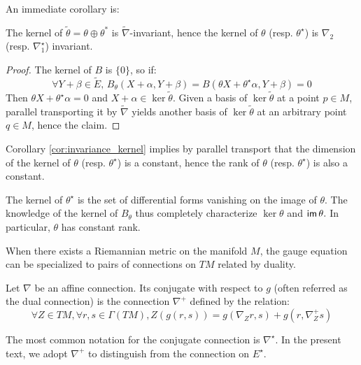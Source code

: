  An immediate corollary is:
 \begin{cor}
 \label{cor:invariance_kernel}
 The kernel of $\tilde{\theta} = \theta \oplus \theta^*$ is 
 $\tilde{\nabla}$-invariant, hence the kernel of $\theta$ (resp. $\theta^\star$) is $\nabla_2$ (resp. $\nabla_1^\star$) invariant.
 \end{cor}
 \begin{proof}
 The kernel of $B$ is $\{0\}$, so if:
 \begin{equation}
     \forall Y + \beta \in \tilde{E}, \, B_\theta \left( X+\alpha, Y+\beta\right) = B(\theta X + \theta^\star \alpha, Y + \beta) = 0
 \end{equation}
 Then $\theta X + \theta^\star \alpha = 0$ and $X + \alpha \in \ker \tilde{\theta}.$ Given a basis of $\ker \tilde{\theta}$ at a point $p \in M$, parallel transporting it by $\tilde{\nabla}$ yields another basis of $\ker \tilde{\theta}$ at an arbitrary point $q\in M$, hence the claim.
 \end{proof}
 \begin{rem}
Corollary \ref{cor:invariance_kernel} implies by parallel transport that the dimension of the kernel of $\theta$ (resp. $\theta^\star$) is a constant, hence the rank of $\theta$ (resp. $\theta^\star$) is also a constant. 
\end{rem}
\begin{rem}
The kernel of $\theta^\star$ is the set of differential forms vanishing on the image of $\theta.$ The knowledge of the kernel of $B_\theta$ thus completely characterize $\ker \theta$ and $\operatorname{\textsf{im}} \theta.$ In particular, $\theta$ has constant rank.
\end{rem}
When there exists a Riemannian metric on the manifold $M$, the gauge equation can be specialized to pairs of connections on $TM$ related by duality. 
\begin{defn}
    \label{def:conjugate_connection}
    Let $\nabla$ be an affine connection. Its conjugate with respect to $g$ (often referred as the dual connection) is the connection $\nabla^+$ defined by the relation:
    \begin{equation}
    \label{eq:conjugate_connection}
    \forall Z \in TM, \forall r,s \in \Gamma \left(TM 
    \right), Z\left( g(r,s) \right) = g\left(\nabla_Z r, s\right) + 
    g\left( r, \nabla_Z^+ s\right)
    \end{equation}
\end{defn}
\begin{rem}
The most common notation for the conjugate connection is $\nabla^\star.$ In the present text, we adopt $\nabla^+$ to distinguish from the connection on $E^\star.$
\end{rem}
